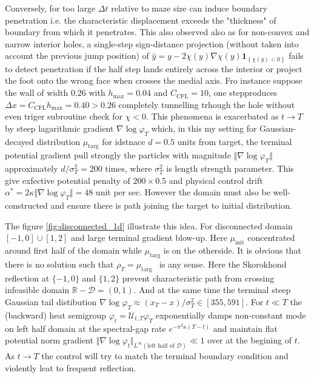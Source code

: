 \documentclass[10pt,a4paper]{article}
\begin{document}
Conversely, for too large $\displaystyle \Delta t$ relative to maze size can induce boundary 
penetration i.e. the characteristic displacement exceeds the "thickness" of boundary from 
which it penetrates. This also observed also as for non-convex and narrow interior holes, 
a single-step sign-distance projection (without taken into account the previous jump position) 
of $\displaystyle \hat{y} =y-2\chi ( y) \nabla \chi ( y)\mathbf{1}_{\left\{\chi ( y) < 0\right\}}$ 
fails to detect penetration if the half step lands entirely across the interior or project 
the foot onto the wrong face when crosses the medial axis. Fro instance suppose the wall 
of width $\displaystyle 0.26$ with $\displaystyle h_{\text{max}} =0.04$ and $\displaystyle 
C_{\text{CFL}} =10$, one stepproduces $\displaystyle \Delta x=C_{\text{CFL}} h_{\text{max}} 
=0.40 >0.26$ completely tunnelling trhough the hole without even triger subroutine check 
for $\displaystyle \chi < 0$. This phenomena is exacerbated as $\displaystyle t\rightarrow T$ 
by steep lagarithmic gradient $\displaystyle \nabla \log \varphi _{T}$ which, in this my setting 
for Gaussian-decayed distribution $\displaystyle \mu _{\text{targ}}$ for idstnace 
$\displaystyle d=0.5$ units from target, the terminal potential gradient pull strongly 
the particles with magnitude $\displaystyle \Vert \nabla \log \varphi _{T}\Vert $ approximately 
$\displaystyle d/\sigma _{T}^{2} =200$ times, where $\displaystyle \sigma _{T}^{2}$ is length 
strength parameter. This give exfective potential penalty of $\displaystyle 200\times 0.5$ and 
physical control drift $\displaystyle \alpha ^{*} =2\kappa \Vert \nabla \log \varphi _{T}\Vert =48$ 
unit per sec. However the domain must also be well-constructed and ensure there is path joining 
the target to initial distribution. 

The figure \ref{fig:disconnected_1d} illustrate this idea. For disconnected 
domain $\displaystyle [ -1,0] \cup [ 1,2]$ and large terminal 
gradient blow-up. Here $\displaystyle \mu _{\text{init}}$ concentrated around 
first half of the domain while $\displaystyle \mu _{\text{targ}}$ is on the otherside.
It is obvious that there is no solution such that $\displaystyle \rho _{T} =\mu _{\text{targ}}$ \ 
is any sense. Here the Skorokhond reflection at $\displaystyle \{-1,0\}$ and $\displaystyle \{1,2\}$ 
prevent characteristic path from crossing infeasible domain 
$\displaystyle \mathbb{R} -\mathcal{D} =( 0,1)$. And at the same time the terminal steep 
Gaussian tail distibution $\displaystyle \nabla \log \varphi _{T} \approx 
( x_{T} -x) /\sigma _{T}^{2} \in [ 355,591]$. For $\displaystyle t\ll T$ 
the (backward) heat semigroup $\displaystyle \varphi _{t} =\mathcal{U}_{t,T} \varphi _{T}$ 
exponentially damps non-constant mode on left half domain at the spectral-gap rate 
$\displaystyle e^{-\pi ^{2} \kappa ( T-t)}$ and maintain flat potential norm 
gradient $\displaystyle \Vert \nabla \log \varphi _{t}\Vert _{L^{\infty }\left(\text{left half of }
\mathcal{D}\right)} \ll 1$ over at the begining of $\displaystyle t$. As $\displaystyle t
\rightarrow T$ the control will try to match the terminal boundary condition and violently 
leat to frequent reflection. 
\end{document}
